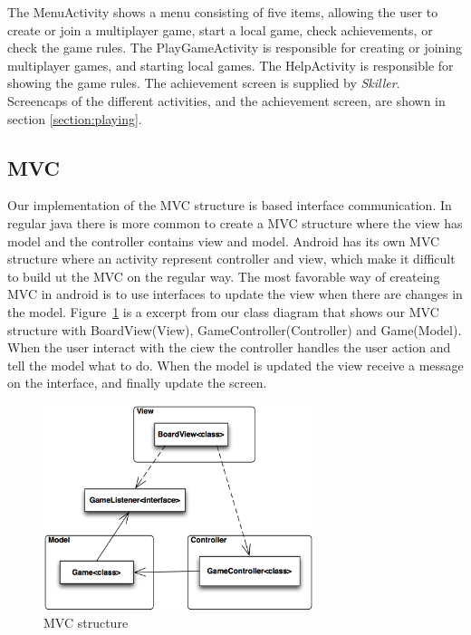 The MenuActivity shows a menu consisting of five items, allowing the user to create or join a multiplayer game, start a local game, check achievements, or check the game rules. The PlayGameActivity is responsible for creating or joining multiplayer games, and starting local games. The HelpActivity is responsible for showing the game rules. The achievement screen is supplied by \emph{Skiller}.\\

Screencaps of the different activities, and the achievement screen, are shown in section \ref{section:playing}.

\subsection{MVC}

Our implementation of the MVC structure is based interface communication. In regular java there is more common to create a MVC structure where the view has model and the controller contains view and model. Android has its own MVC structure where an activity represent controller and view, which make it difficult to build ut the MVC on the regular way. The most favorable way of createing MVC in android is to use interfaces to update the view when there are changes in the model. Figure~\ref{fig:mvc} is a excerpt from our class diagram that shows our MVC structure with BoardView(View), GameController(Controller) and Game(Model). When the user interact with the ciew the controller handles the user action and tell the model what to do. When the model is updated the view receive a message on the interface, and finally update the screen.


\begin{figure}[H]
\begin{center}
\includegraphics[width=0.7\textwidth]{Images/mvc}
\caption{MVC structure}
\label{fig:mvc}
\end{center}
\end{figure}






